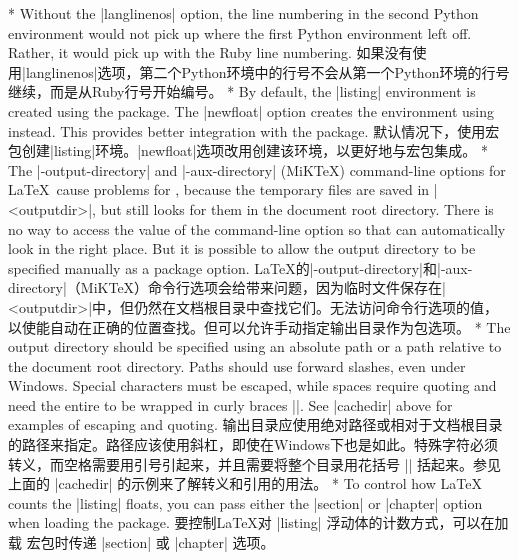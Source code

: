\begin{paracol}{2}
\switchcolumn[0]*%
Without the |langlinenos| option, the line numbering in the second Python environment would not pick up where the first Python environment left off.  Rather, it would pick up with the Ruby line numbering.
\switchcolumn
如果没有使用|langlinenos|选项，第二个Python环境中的行号不会从第一个Python环境的行号继续，而是从Ruby行号开始编号。
\switchcolumn[0]*%
By default, the |listing| environment is created using the  package.  The |newfloat| option creates the environment using  instead.  This provides better integration with the  package.
\switchcolumn
{}
默认情况下，使用宏包创建|listing|环境。|newfloat|选项改用创建该环境，以更好地与宏包集成。
\switchcolumn[0]*%
The |-output-directory| and |-aux-directory| (MiKTeX) command-line options for \LaTeX\ cause problems for , because the  temporary files are saved in |<outputdir>|, but  still looks for them in the document root directory.  There is no way to access the value of the command-line option so that  can automatically look in the right place.  But it is possible to allow the output directory to be specified manually as a package option.
\switchcolumn
{}
\LaTeX 的|-output-directory|和|-aux-directory|（MiKTeX）命令行选项会给带来问题，因为临时文件保存在|<outputdir>|中，但仍然在文档根目录中查找它们。无法访问命令行选项的值，以使能自动在正确的位置查找。但可以允许手动指定输出目录作为包选项。
\switchcolumn[0]*%
The output directory should be specified using an absolute path or a path relative to the document root directory.  Paths should use forward slashes, even under Windows.  Special characters must be escaped, while spaces require quoting and need the entire  to be wrapped in curly braces |{}|.  See |cachedir| above for examples of escaping and quoting.
\switchcolumn
输出目录应使用绝对路径或相对于文档根目录的路径来指定。路径应该使用斜杠，即使在Windows下也是如此。特殊字符必须转义，而空格需要用引号引起来，并且需要将整个目录用花括号 |{}| 括起来。参见上面的 |cachedir| 的示例来了解转义和引用的用法。
\switchcolumn[0]*%
To control how \LaTeX{} counts the |listing| floats, you can pass either the
|section| or |chapter| option when loading the  package.
\switchcolumn
{}
要控制\LaTeX{}对 |listing| 浮动体的计数方式，可以在加载  宏包时传递 |section| 或 |chapter| 选项。
\end{paracol}



